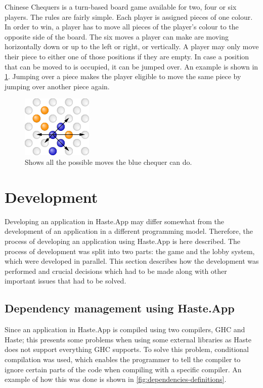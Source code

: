 \documentclass[a4paper]{article}
\begin{document}
Chinese Chequers is a turn-based board game available for two, four or six players. The rules are fairly simple. Each player is assigned pieces of one colour. In order to win, a player has to move all pieces of the player's colour to the opposite side of the board. The six moves a player can make are moving horizontally down or up to the left or right, or vertically. A player may only move their piece to either one of those positions if they are empty. In case a position that can be moved to is occupied, it can be jumped over. An example is shown in \cref{fig:chequers-move}. Jumping over a piece makes the player eligible to move the same piece by jumping over another piece again.
\begin{figure}[ht]
    \centering
    \includegraphics[width=0.3\textwidth]{figure/moves}
    \caption{Shows all the possible moves the blue chequer can do.}
    \label{fig:chequers-move}
\end{figure}

\newpage
\section{Development}
Developing an application in Haste.App may differ somewhat from the development of an application in a different programming model. Therefore, the process of developing an application using Haste.App is here described. The process of development was split into two parts: the game and the lobby system, which were developed in parallel. This section describes how the development was performed and crucial decisions which had to be made along with other important issues that had to be solved.

\subsection{Dependency management using Haste.App}
\label{sub:dependencies}
Since an application in Haste.App is compiled using two compilers, GHC and Haste; this presents some problems when using some external libraries as Haste does not support everything GHC supports. To solve this problem, conditional compilation was used, which enables the programmer to tell the compiler to ignore certain parts of the code when compiling with a specific compiler. An example of how this was done is shown in \cref{fig:dependencies-definitions}.
\end{document}
